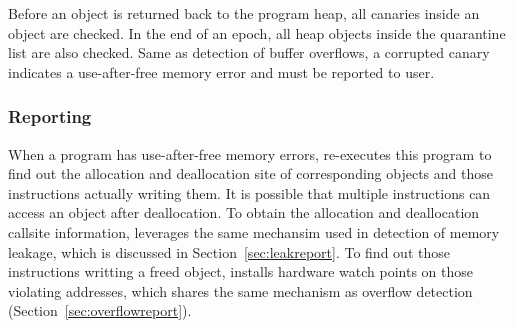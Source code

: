 Before an object is returned back to the program heap,
all canaries inside an object are checked. 
In the end of an epoch, all heap objects inside the quarantine list are also checked. 
Same as detection of buffer overflows, 
a corrupted canary indicates a use-after-free memory error and must be reported to
user. 

\subsubsection{Reporting}
When a program has use-after-free memory errors, 
\doubletake{} re-executes this program to find out the allocation and deallocation site
of corresponding objects and those instructions actually writing them.
It is possible that multiple instructions can access an object after deallocation.  
To obtain the allocation and deallocation callsite information, 
\doubletake{} leverages the same mechansim used in
detection of memory leakage, which is discussed in Section~\ref{sec:leakreport}.
To find out those instructions writting a freed object, 
\doubletake{} installs hardware watch points on those violating addresses, which
shares the same mechanism as overflow detection (Section~\ref{sec:overflowreport}).
